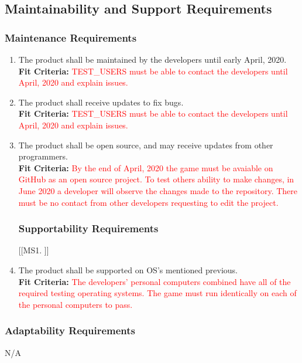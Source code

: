 \documentclass[12pt, titlepage]{article}
\begin{document}
\subsection{Maintainability and Support Requirements}

\subsubsection{Maintenance Requirements}
\begin{enumerate}[{MS}1. ]
    \item The product shall be maintained by the developers until early April, 2020.\\
    \textbf{Fit Criteria:} \textcolor{red}{TEST\_USERS must be able to contact the developers until April, 2020 and explain issues.}
    \item The product shall receive updates to fix bugs.\\
    \textbf{Fit Criteria:} \textcolor{red}{TEST\_USERS must be able to contact the developers until April, 2020 and explain issues.}
    \item The product shall be open source, and may receive updates from other programmers.\\
    \textbf{Fit Criteria:} \textcolor{red}{By the end of April, 2020 the game must be avaiable on GitHub as an open source project. To test others ability to make changes, in June 2020 a developer will observe the changes made to the repository. There must be no contact from other developers requesting to edit the project.}

\subsubsection{Supportability Requirements}
[{[{MS}1. ]}]
    \item The product shall be supported on OS's mentioned previous.\\
    \textbf{Fit Criteria:} \textcolor{red}{The developers' personal computers combined have all of the required testing operating systems. The game must run identically on each of the personal computers to pass.}
\end{enumerate}

\subsubsection{Adaptability Requirements}
N/A
\end{document}
